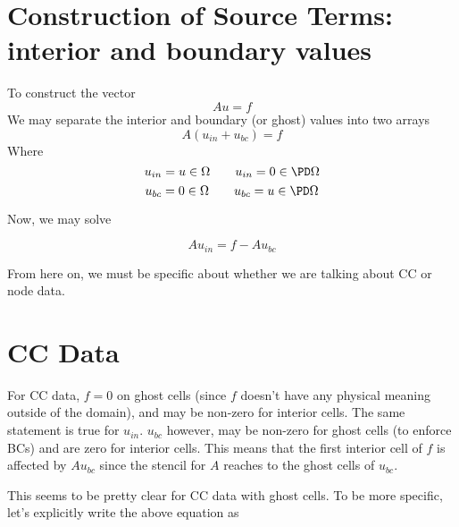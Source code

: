 \documentclass[11pt]{article}
\begin{document}
\doublespacing
\MOONSTITLE
\maketitle

\section{Construction of Source Terms: interior and boundary values}
To construct the vector
\begin{equation}
Au=f
\end{equation}
We may separate the interior and boundary (or ghost) values into two arrays
\begin{equation}
A(u_{in} + u_{bc}) = f
\end{equation}
Where
\begin{equation}
u_{in} = u \in \Omega \qquad u_{in} = 0 \in \PD \Omega
\end{equation}
\begin{equation}
u_{bc} = 0 \in \Omega \qquad u_{bc} = u \in \PD \Omega
\end{equation}

Now, we may solve

\begin{equation}
Au_{in} = f - Au_{bc}
\end{equation}

From here on, we must be specific about whether we are talking about CC or node data.

\section{CC Data}
For CC data, $f = 0$ on ghost cells (since $f$ doesn't have any physical meaning outside of the domain), and may be non-zero for interior cells. The same statement is true for $u_{in}$. $u_{bc}$ however, may be non-zero for ghost cells (to enforce BCs) and are zero for interior cells. This means that the first interior cell of $f$ is affected by $Au_{bc}$ since the stencil for $A$ reaches to the ghost cells of $u_{bc}$.

This seems to be pretty clear for CC data with ghost cells.
To be more specific, let's explicitly write the above equation as
\end{document}
